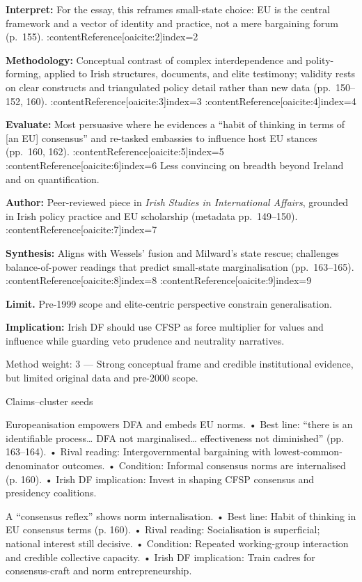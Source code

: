 \textbf{Interpret:} For the essay, this reframes small-state choice: EU is the central framework and a vector of identity and practice, not a mere bargaining forum (p.~155). :contentReference[oaicite:2]{index=2}

\textbf{Methodology:} Conceptual contrast of complex interdependence and polity-forming, applied to Irish structures, documents, and elite testimony; validity rests on clear constructs and triangulated policy detail rather than new data (pp.~150–152, 160). :contentReference[oaicite:3]{index=3} :contentReference[oaicite:4]{index=4}

\textbf{Evaluate:} Most persuasive where he evidences a “habit of thinking in terms of [an EU] consensus” and re-tasked embassies to influence host EU stances (pp.~160, 162). :contentReference[oaicite:5]{index=5} :contentReference[oaicite:6]{index=6} Less convincing on breadth beyond Ireland and on quantification.

\textbf{Author:} Peer-reviewed piece in \textit{Irish Studies in International Affairs}, grounded in Irish policy practice and EU scholarship (metadata pp.~149–150). :contentReference[oaicite:7]{index=7}

\textbf{Synthesis:} Aligns with Wessels’ fusion and Milward’s state rescue; challenges balance-of-power readings that predict small-state marginalisation (pp.~163–165). :contentReference[oaicite:8]{index=8} :contentReference[oaicite:9]{index=9}

\textbf{Limit.} Pre-1999 scope and elite-centric perspective constrain generalisation.

\textbf{Implication:} Irish DF should use CFSP as force multiplier for values and influence while guarding veto prudence and neutrality narratives.

Method weight: 3 — Strong conceptual frame and credible institutional evidence, but limited original data and pre-2000 scope.

Claims–cluster seeds

Europeanisation empowers DFA and embeds EU norms.
• Best line: “there is an identifiable process… DFA not marginalised… effectiveness not diminished” (pp. 163–164).
• Rival reading: Intergovernmental bargaining with lowest-common-denominator outcomes.
• Condition: Informal consensus norms are internalised (p. 160).
• Irish DF implication: Invest in shaping CFSP consensus and presidency coalitions.

A “consensus reflex” shows norm internalisation.
• Best line: Habit of thinking in EU consensus terms (p. 160).
• Rival reading: Socialisation is superficial; national interest still decisive.
• Condition: Repeated working-group interaction and credible collective capacity.
• Irish DF implication: Train cadres for consensus-craft and norm entrepreneurship.

